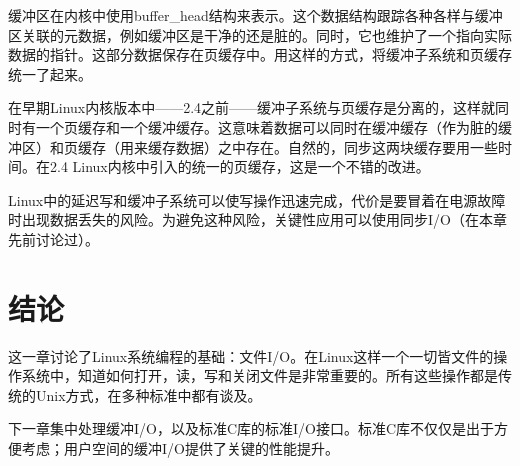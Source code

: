 缓冲区在内核中使用buffer\_head结构来表示。这个数据结构跟踪各种各样与缓冲区关联的元数据，例如缓冲区是干净的还是脏的。同时，它也维护了一个指向实际数据的指针。这部分数据保存在页缓存中。用这样的方式，将缓冲子系统和页缓存统一了起来。

在早期Linux内核版本中——2.4之前——缓冲子系统与页缓存是分离的，这样就同时有一个页缓存和一个缓冲缓存。这意味着数据可以同时在缓冲缓存（作为脏的缓冲区）和页缓存（用来缓存数据）之中存在。自然的，同步这两块缓存要用一些时间。在2.4 Linux内核中引入的统一的页缓存，这是一个不错的改进。

Linux中的延迟写和缓冲子系统可以使写操作迅速完成，代价是要冒着在电源故障时出现数据丢失的风险。为避免这种风险，关键性应用可以使用同步I/O（在本章先前讨论过）。 

\section{结论}

这一章讨论了Linux系统编程的基础：文件I/O。在Linux这样一个一切皆文件的操作系统中，知道如何打开，读，写和关闭文件是非常重要的。所有这些操作都是传统的Unix方式，在多种标准中都有谈及。

下一章集中处理缓冲I/O，以及标准C库的标准I/O接口。标准C库不仅仅是出于方便考虑；用户空间的缓冲I/O提供了关键的性能提升。 


